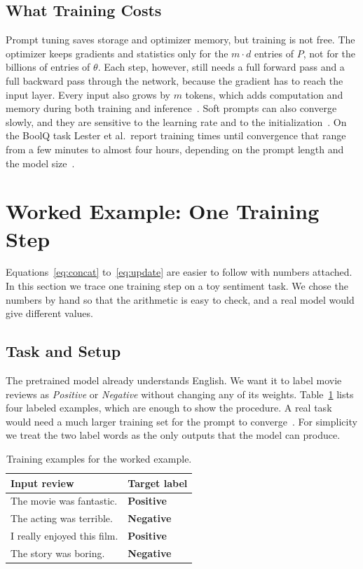 \documentclass[12pt]{article}
\begin{document}
\subsection{What Training Costs}\label{sec:trainingcost}

Prompt tuning saves storage and optimizer memory, but training is not free. The optimizer
keeps gradients and statistics only for the $m\cdot d$ entries of $P$, not for the billions of
entries of $\theta$. Each step, however, still needs a full forward pass and a full backward
pass through the network, because the gradient has to reach the input layer. Every input also
grows by $m$ tokens, which adds computation and memory during both training and
inference~\cite{li2025survey}. Soft prompts can also converge slowly, and they are
sensitive to the learning rate and to the initialization~\cite{li2025survey}. On the BoolQ
task Lester et al.\ report training times until convergence that range from a few minutes to
almost four hours, depending on the prompt length and the model size~\cite{lester2021}.

\section{Worked Example: One Training Step}\label{sec:example}

Equations~\eqref{eq:concat} to~\eqref{eq:update} are easier to follow with numbers attached.
In this section we trace one training step on a toy sentiment task. We chose the numbers by
hand so that the arithmetic is easy to check, and a real model would give different values.

\subsection{Task and Setup}\label{sec:extask}

The pretrained model already understands English. We want it to label movie reviews as
\emph{Positive} or \emph{Negative} without changing any of its weights.
Table~\ref{tab:exdata} lists four labeled examples, which are enough to show the procedure. A
real task would need a much larger training set for the prompt to
converge~\cite{li2025survey}. For simplicity we treat the two label words as the only outputs
that the model can produce.

\begin{table}[htbp]
  \centering
  \caption{Training examples for the worked example.}
  \label{tab:exdata}
  \small
  \begin{tabular}{@{}l l@{}}
    \toprule
    \textbf{Input review} & \textbf{Target label}\\
    \midrule
    The movie was fantastic.    & \textcolor{ptgreen}{\textbf{Positive}}\\
    The acting was terrible.    & \textcolor{ptred}{\textbf{Negative}}\\
    I really enjoyed this film. & \textcolor{ptgreen}{\textbf{Positive}}\\
    The story was boring.       & \textcolor{ptred}{\textbf{Negative}}\\
    \bottomrule
  \end{tabular}
\end{table}
\end{document}
